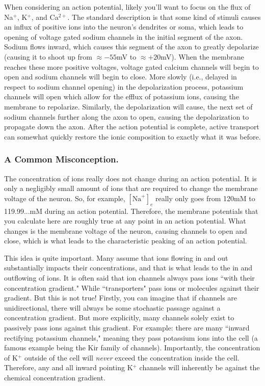 When considering an action potential, likely you'll want to focus on the flux of Na$^+$, K$^+$, and Ca$^{2+}$. The standard description is that some kind of stimuli causes an influx of positive ions into the neuron's dendrites or soma, which leads to opening of voltage gated sodium channels in the initial segment of the axon. Sodium flows inward, which causes this segment of the axon to greatly depolarize (causing it to shoot up from $\approx -55$mV to $\approx +20$mV). When the membrane reaches these more positive voltages, voltage gated calcium channels will begin to open and sodium channels will begin to close. More slowly (i.e., delayed in respect to sodium channel opening) in the depolarization process, potassium channels will open which allow for the efflux of potassium ions, causing the membrane to repolarize.  Similarly, the depolarization will cause, the next set of sodium channels further along the axon to open, causing the depolarization to propagate down the axon. After the action potential is complete, active transport can somewhat quickly restore the ionic composition to exactly what it was before.\newline


\subsubsection{A Common Misconception.}

The concentration of ions really does not change during an action potential. It is only a negligibly small amount of ions that are required to change the membrane voltage of the neuron. So, for example, $[\mathrm{Na}^+]_e$ really only goes from 120mM to 119.99...mM during an action potential. Therefore, the membrane potentials that you calculate here are roughly true at any point in an action potential. What changes is the membrane voltage of the neuron, causing channels to open and close, which is what leads to the characteristic peaking of an action potential.\newline

This idea is quite important. Many assume that ions flowing in and out substantially impacts their concentrations, and that is what leads to the in and outflowing of ions. It is often said that ion channels always pass ions ``with their concentration gradient." While ``transporters" pass ions or molecules against their gradient. But this is not true! Firstly, you can imagine that if channels are unidirectional, there will always be some stochastic passage against a concentration gradient. But more explicitly, many channels solely exist to passively pass ions against this gradient. For example: there are many ``inward rectifying potassium channels," meaning they pass potassium ions into the cell (a famous example being the Kir family of channels). Importantly, the concentration of K$^+$ outside of the cell will \textit{never} exceed the concentration inside the cell. Therefore, any and all inward pointing K$^+$ channels will inherently be against the chemical concentration gradient.\newline

